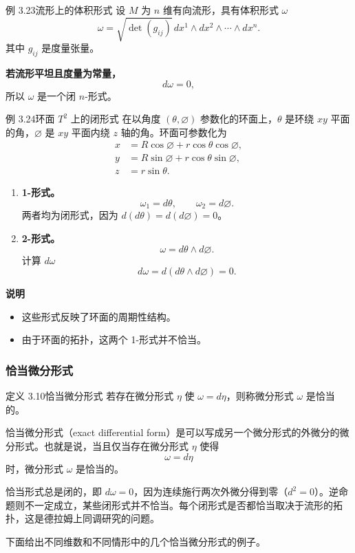 \begin{statement}{例 3.23}{流形上的体积形式}
设 $M$ 为 $n$ 维有向流形，具有体积形式 $\omega$
\begin{equation*}
  \omega=\sqrt{\det(g_{ij})}\,dx^1\wedge dx^2\wedge\cdots\wedge dx^n.
  \tag{3.3}\label{eq:3.3}
\end{equation*}
其中 $g_{ij}$ 是度量张量。

\noindent\textbf{若流形平坦且度量为常量，}
\[
  d\omega=0,
\]
所以 $\omega$ 是一个闭 $n$-形式。
\end{statement}

\begin{statement}{例 3.24}{环面 $T^2$ 上的闭形式}
在以角度 $(\theta,\varnothing)$ 参数化的环面上，$\theta$ 是环绕 $xy$ 平面的角，$\varnothing$ 是 $xy$ 平面内绕 $z$ 轴的角。环面可参数化为
\begin{align*}
  x&=R\cos\varnothing+r\cos\theta\cos\varnothing,\\
  y&=R\sin\varnothing+r\cos\theta\sin\varnothing,\\
  z&=r\sin\theta.
\end{align*}
\begin{enumerate}
\item \textbf{1-形式。}
\[
  \omega_1=d\theta,\qquad \omega_2=d\varnothing.
\]
两者均为闭形式，因为 $d(d\theta)=d(d\varnothing)=0$。
\item \textbf{2-形式。}
\[
  \omega=d\theta\wedge d\varnothing.
\]
计算 $d\omega$
\[
  d\omega=d(d\theta\wedge d\varnothing)=0.
\]
\end{enumerate}

\noindent\textbf{说明}
\begin{itemize}
\item 这些形式反映了环面的周期性结构。
\item 由于环面的拓扑，这两个 1-形式并不恰当。
\end{itemize}
\end{statement}

\subsubsection{恰当微分形式}
\begin{statement}{定义 3.10}{恰当微分形式}
若存在微分形式 $\eta$ 使 $\omega=d\eta$，则称微分形式 $\omega$ 是恰当的。

恰当微分形式（exact differential form）是可以写成另一个微分形式的外微分的微分形式。也就是说，当且仅当存在微分形式 $\eta$ 使得
\[
  \omega=d\eta
\]
时，微分形式 $\omega$ 是恰当的。

恰当形式总是闭的，即 $d\omega=0$，因为连续施行两次外微分得到零（$d^2=0$）。逆命题则不一定成立，某些闭形式并不恰当。每个闭形式是否都恰当取决于流形的拓扑，这是德拉姆上同调研究的问题。

下面给出不同维数和不同情形中的几个恰当微分形式的例子。
\end{statement}

